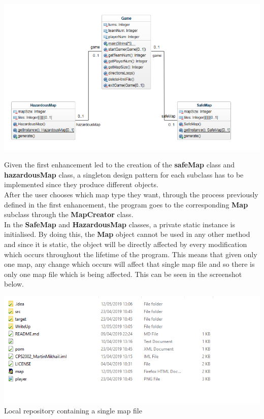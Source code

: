 \documentclass[a4paper,12pt]{extarticle}
\begin{document}
\begin{center}
\includegraphics[width=\textwidth]{Enhancement2CD.png}\\
\end{center}

\noindent Given the first enhancement led to the creation of the \textbf{safeMap} class and \textbf{hazardousMap} class, a singleton design pattern for each subclass has to be implemented since they produce different objects.\\

\noindent After the user chooses which map type they want, through the process previously defined in the first enhancement, the program goes to the corresponding \textbf{Map} subclass through the \textbf{MapCreator} class.\\ 

\noindent In the \textbf{SafeMap} and \textbf{HazardousMap} classes, a private static instance is initialised. By doing this, the \textbf{Map} object cannot be used in any other method and since it is static, the object will be directly affected by every modification which occurs throughout the lifetime of the program. This means that given only one map, any change which occurs will affect that single map file and so there is only one map file which is being affected. This can be seen in the screenshot below.\\

\begin{center}
\includegraphics[width=\textwidth]{Singleton1.png}\\
Local repository containing a single map file
\end{center}
\end{document}
